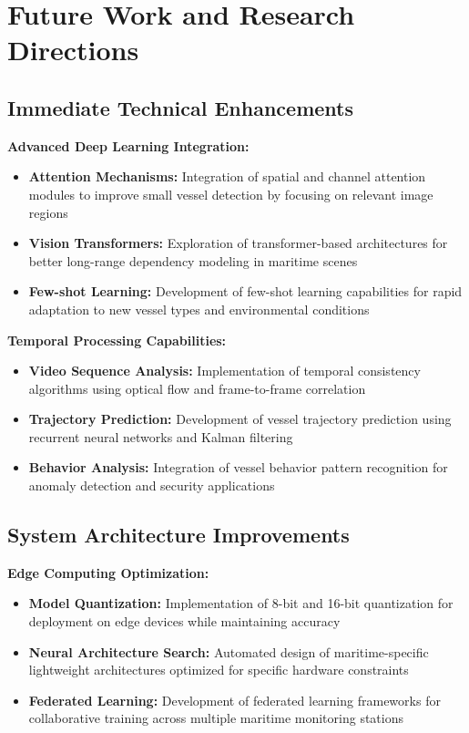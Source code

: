\documentclass[12pt,a4paper]{report}
\begin{document}
\section{Future Work and Research Directions}

\subsection{Immediate Technical Enhancements}

\textbf{Advanced Deep Learning Integration:}
\begin{itemize}
    \item \textbf{Attention Mechanisms:} Integration of spatial and channel attention modules to improve small vessel detection by focusing on relevant image regions
    \item \textbf{Vision Transformers:} Exploration of transformer-based architectures for better long-range dependency modeling in maritime scenes
    \item \textbf{Few-shot Learning:} Development of few-shot learning capabilities for rapid adaptation to new vessel types and environmental conditions
\end{itemize}

\textbf{Temporal Processing Capabilities:}
\begin{itemize}
    \item \textbf{Video Sequence Analysis:} Implementation of temporal consistency algorithms using optical flow and frame-to-frame correlation
    \item \textbf{Trajectory Prediction:} Development of vessel trajectory prediction using recurrent neural networks and Kalman filtering
    \item \textbf{Behavior Analysis:} Integration of vessel behavior pattern recognition for anomaly detection and security applications
\end{itemize}

\subsection{System Architecture Improvements}

\textbf{Edge Computing Optimization:}
\begin{itemize}
    \item \textbf{Model Quantization:} Implementation of 8-bit and 16-bit quantization for deployment on edge devices while maintaining accuracy
    \item \textbf{Neural Architecture Search:} Automated design of maritime-specific lightweight architectures optimized for specific hardware constraints
    \item \textbf{Federated Learning:} Development of federated learning frameworks for collaborative training across multiple maritime monitoring stations
\end{itemize}
\end{document}
